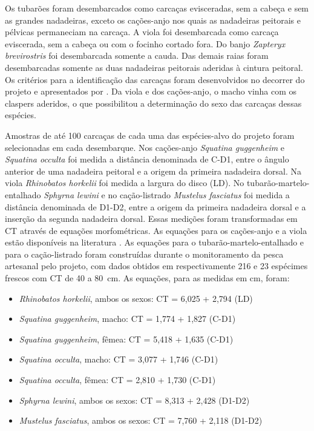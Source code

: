 \documentclass[a4paper,11pt,twoside,showtrims,onecolumn,openright,final]{memoir}
\begin{document}
Os tubarões foram desembarcados como carcaças evisceradas, sem a cabeça e sem as grandes nadadeiras, 
exceto os cações-anjo nos quais as nadadeiras peitorais e pélvicas permaneciam na carcaça. 
A viola foi desembarcada como carcaça eviscerada, sem a cabeça ou com o focinho cortado fora. 
Do banjo \emph{Zapteryx brevirostris} foi desembarcada somente a cauda. Das demais raias foram 
desembarcadas somente as duas nadadeiras peitorais aderidas à cintura peitoral. Os critérios para 
a identificação das carcaças foram desenvolvidos no decorrer do projeto 
e apresentados por \citet{vooren2003}. %
Da viola e dos cações-anjo, o macho vinha com os claspers aderidos, o que possibilitou a determinação 
do sexo das carcaças dessas espécies.

Amostras de até 100 carcaças de cada uma das espécies-alvo do projeto foram selecionadas em 
cada desembarque. Nos cações-anjo \emph{Squatina guggenheim} e \emph{Squatina occulta} foi medida 
a distância denominada de C-D1, entre o ângulo anterior de uma nadadeira peitoral e a origem 
da primeira nadadeira dorsal. Na viola \emph{Rhinobatos horkelii} foi medida a largura do disco (LD). 
No tubarão-martelo-entalhado \emph{Sphyrna lewini} e no cação-listrado \emph{Mustelus fasciatus} foi 
medida a distância denominada de D1-D2, entre a origem da primeira nadadeira dorsal e a inserção da 
segunda nadadeira dorsal. Essas medições foram transformadas em CT através de equações morfométricas. 
As equações para os cações-anjo e a viola estão disponíveis na literatura \citep{lessa1982,vieira1996}. %
As equações para o tubarão-martelo-entalhado e para o cação-listrado foram construídas durante o 
monitoramento da pesca artesanal pelo projeto, com dados obtidos em respectivamente 216 e 23 espécimes 
frescos com CT de 40 a 80~cm. As equações, para as medidas em cm,  foram:

\begin{itemize}

\item \emph{Rhinobatos horkelii}, ambos os sexos: CT = 6,025 + 2,794 (LD)
\item \emph{Squatina guggenheim}, macho: CT = 1,774 + 1,827 (C-D1)
\item \emph{Squatina guggenheim}, fêmea: CT =  5,418 + 1,635 (C-D1)
\item \emph{Squatina occulta}, macho: CT = 3,077 + 1,746 (C-D1)
\item \emph{Squatina occulta}, fêmea: CT =  2,810 + 1,730 (C-D1)
\item \emph{Sphyrna lewini}, ambos os sexos: CT =  8,313 + 2,428 (D1-D2) 
\item \emph{Mustelus fasciatus}, ambos os sexos: CT = 7,760 + 2,118 (D1-D2)

\end{itemize}
\end{document}
